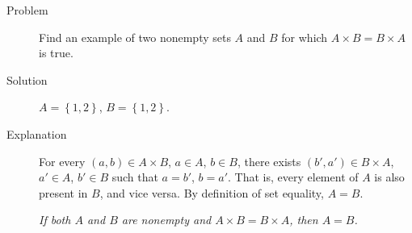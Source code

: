 \begin{description}
\item[Problem]
Find an example of two nonempty sets $A$ and $B$ for which $A \times B = B
\times A$ is true.

\item[Solution]
        $A = \left\{1, 2\right\}$, $B = \left\{1, 2\right\}$.

\item[Explanation]

For every $(a, b) \in A \times B$, $a \in A$, $b \in B$, there exists $(b', a')
\in B \times A$, $a' \in A$, $b' \in B$ such that $a = b'$, $b = a'$.  That is,
every element of $A$ is also present in $B$, and vice versa. By definition of
set equality, $A = B$.

\it If both $A$ and $B$ are nonempty and $A \times B = B \times A$, then
$A = B$.

\end{description}
